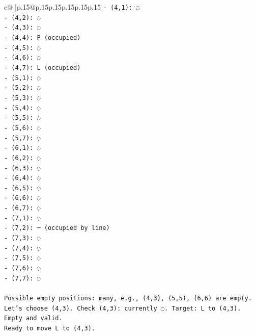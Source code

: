 \documentclass{article}
\begin{document}
{\begin{supertabular}{c@{$\;$}|p{.15\linewidth}@{}p{.15\linewidth}p{.15\linewidth}p{.15\linewidth}p{.15\linewidth}p{.15\linewidth}}
{{{\texttt{{-} (4,1): ◌} \\
\texttt{{-} (4,2): ◌} \\
\texttt{{-} (4,3): ◌} \\
\texttt{{-} (4,4): P (occupied)} \\
\texttt{{-} (4,5): ◌} \\
\texttt{{-} (4,6): ◌} \\
\texttt{{-} (4,7): L (occupied)} \\
\texttt{{-} (5,1): ◌} \\
\texttt{{-} (5,2): ◌} \\
\texttt{{-} (5,3): ◌} \\
\texttt{{-} (5,4): ◌} \\
\texttt{{-} (5,5): ◌} \\
\texttt{{-} (5,6): ◌} \\
\texttt{{-} (5,7): ◌} \\
\texttt{{-} (6,1): ◌} \\
\texttt{{-} (6,2): ◌} \\
\texttt{{-} (6,3): ◌} \\
\texttt{{-} (6,4): ◌} \\
\texttt{{-} (6,5): ◌} \\
\texttt{{-} (6,6): ◌} \\
\texttt{{-} (6,7): ◌} \\
\texttt{{-} (7,1): ◌} \\
\texttt{{-} (7,2): ─ (occupied by line)} \\
\texttt{{-} (7,3): ◌} \\
\texttt{{-} (7,4): ◌} \\
\texttt{{-} (7,5): ◌} \\
\texttt{{-} (7,6): ◌} \\
\texttt{{-} (7,7): ◌} \\
\\ 
\texttt{Possible empty positions: many, e.g., (4,3), (5,5), (6,6) are empty. Let's choose (4,3). Check (4,3): currently ◌. Target: L to (4,3). Empty and valid.} \\
\texttt{Ready to move L to (4,3).} \\
            }
        }
    }
     \\ \\


\end{supertabular}}
\end{document}
